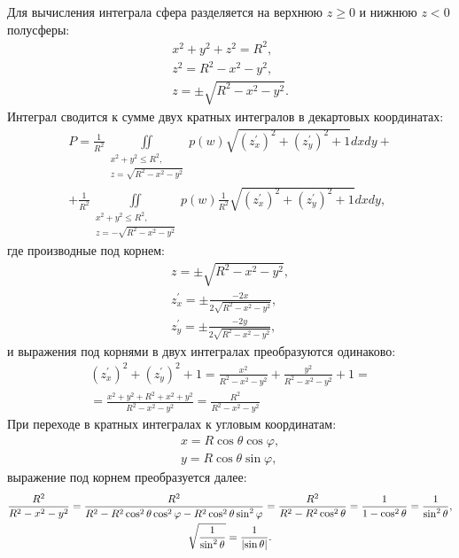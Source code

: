 Для вычисления интеграла сфера разделяется на верхнюю $z \ge 0$ и нижнюю $z < 0$ полусферы:
\begin{gather*}
    x^2 + y^2 + z^2 = R^2 , \\
    z^2 = R^2 - x^2 - y^2 , \\
    z = \pm \sqrt{R^2 - x^2 - y^2} .
\end{gather*}
Интеграл сводится к сумме двух кратных интегралов в декартовых координатах:
\begin{multline*}
    P
    = \frac{1}{R^2} \iint
    \limits_{
        \begin{array}{c}
            x^2 + y^2 \le R^2, \\
            z = \sqrt{R^2 - x^2 - y^2}
        \end{array}
    } p(w) \sqrt{(z_x^\prime)^2 + (z_y^\prime)^2 + 1} dxdy + \\
    + \frac{1}{R^2} \iint
    \limits_{
        \begin{array}{c}
            x^2 + y^2 \le R^2, \\
            z = - \sqrt{R^2 - x^2 - y^2}
        \end{array}
    } p(w) \frac{1}{R^2} \sqrt{(z_x^\prime)^2 + (z_y^\prime)^2 + 1} dxdy ,
\end{multline*}
где производные под корнем:
\begin{gather*}
    z = \pm \sqrt{R^2 - x^2 - y^2} , \\
    z_x^\prime = \pm \frac{-2 x}{2 \sqrt{R^2 - x^2 - y^2}} , \\
    z_y^\prime = \pm \frac{-2 y}{2 \sqrt{R^2 - x^2 - y^2}} ,
\end{gather*}
и выражения под корнями в двух интегралах преобразуются одинаково:
\begin{multline*}
(z_x^\prime)
    ^2 + (z_y^\prime)^2 + 1
    = \frac{x^2}{R^2 - x^2 - y^2} + \frac{y^2}{R^2 - x^2 - y^2} + 1 = \\
    = \frac{x^2 + y^2 + R^2 + x^2 + y^2}{R^2 - x^2 - y^2}
    = \frac{R^2}{R^2 - x^2 - y^2}
\end{multline*}
При переходе в кратных интегралах к угловым координатам:
\begin{gather*}
    x = R \cos \theta \cos \varphi , \\
    y = R \cos \theta \sin \varphi ,
\end{gather*}
выражение под корнем преобразуется далее:
\begin{gather*}
    \frac{R^2}{R^2 - x^2 - y^2}
    = \frac{R^2}{R^2 - R^2 \cos^2 \theta \cos^2 \varphi - R^2 \cos^2 \theta \sin^2 \varphi}
    = \frac{R^2}{R^2 - R^2 \cos^2 \theta}
    = \frac{1}{1 - \cos^2 \theta}
    = \frac{1}{\sin^2 \theta} , \\
    \sqrt{\frac{1}{\sin^2 \theta}}
    = \frac{1}{\left | \sin \theta \right |} .
\end{gather*}
